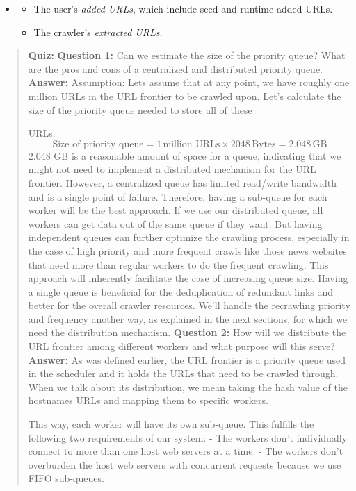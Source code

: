 \begin{itemize}
\item
\begin{itemize}
\item
\protect{}\label{x4W1ZggWClJsHVIF50H6H}
The user's \emph{added URLs}, which include seed and runtime added URLs.
\item
\protect{}\label{UM30MyPVxKrU6oEuj-Srz}
The crawler's \emph{extracted URLs}.
\end{itemize}
\end{itemize}

\begin{quote}
\textbf{Quiz:}
\textbf{Question 1:} Can we estimate the size of the priority queue? What are the pros and cons of a centralized and distributed priority queue.
\textbf{Answer:} Assumption: Let\textquotesingle s assume that at any point, we have roughly one million URLs in the URL frontier to be crawled upon. Let's calculate the size of the priority queue needed to store all of these

URLs. \[
\text{Size of priority queue}
= 1\,\text{million URLs} \times 2048\,\text{Bytes}
= 2.048\,\text{GB}
\]
 2.048 GB is a reasonable amount of space for a queue, indicating that we might not need to implement a distributed mechanism for the URL frontier.
However, a centralized queue has limited read/write bandwidth and is a single point of failure. Therefore, having a sub-queue for each worker will be the best approach.
If we use our distributed queue, all workers can get data out of the same queue if they want. But having independent queues can further optimize the crawling process, especially in the case of high priority and more frequent crawls like those news websites that need more than regular workers to do the frequent crawling. This approach will inherently facilitate the case of increasing queue size. Having a single queue is beneficial for the deduplication of redundant links and better for the overall crawler resources. We'll handle the recrawling priority and frequency another way, as explained in the next sections, for which we need the distribution mechanism.
\textbf{Question 2:} How will we distribute the URL frontier among different workers and what purpose will this serve?
\textbf{Answer:} As was defined earlier, the URL frontier is a priority queue used in the scheduler and it holds the URLs that need to be crawled through. When we talk about its distribution, we mean taking the hash value of the hostname\textquotesingle s URLs and mapping them to specific workers.

This way, each worker will have its own sub-queue. This fulfills the following two requirements of our system: - The workers don't individually connect to more than one host web servers at a time. - The workers don't overburden the host web servers with concurrent requests because we use FIFO sub-queues.
\end{quote}

